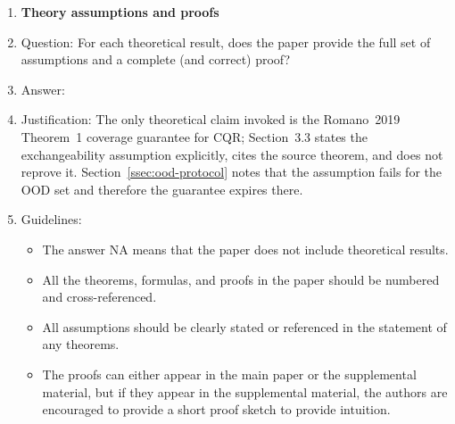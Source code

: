 \documentclass{article}
\begin{document}
\begin{enumerate}
\item {\bf Theory assumptions and proofs}
    \item[] Question: For each theoretical result, does the paper provide the full set of assumptions and a complete (and correct) proof?
    \item[] Answer: \answerYes{}
    \item[] Justification: The only theoretical claim invoked is the Romano~2019 Theorem~1 coverage guarantee for CQR; Section~3.3 states the exchangeability assumption explicitly, cites the source theorem, and does not reprove it. Section~\ref{ssec:ood-protocol} notes that the assumption fails for the OOD set and therefore the guarantee expires there.
    \item[] Guidelines:
    \begin{itemize}
        \item The answer NA means that the paper does not include theoretical results.
        \item All the theorems, formulas, and proofs in the paper should be numbered and cross-referenced.
        \item All assumptions should be clearly stated or referenced in the statement of any theorems.
        \item The proofs can either appear in the main paper or the supplemental material, but if they appear in the supplemental material, the authors are encouraged to provide a short proof sketch to provide intuition.
    \end{itemize}


\end{enumerate}
\end{document}
